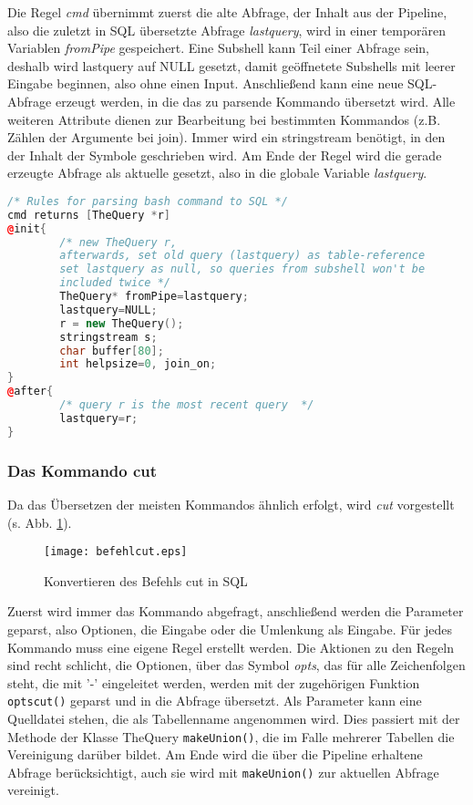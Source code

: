 Die Regel \textit{cmd} übernimmt zuerst die alte Abfrage, der Inhalt aus der Pipeline, also die zuletzt in SQL übersetzte Abfrage \textit{lastquery}, wird in einer temporären Variablen \textit{fromPipe} gespeichert. Eine Subshell kann Teil einer Abfrage sein, deshalb wird lastquery auf NULL gesetzt, damit geöffnetete Subshells mit leerer Eingabe beginnen, also ohne einen Input. Anschließend kann eine neue SQL-Abfrage erzeugt werden, in die das zu parsende Kommando übersetzt wird. Alle weiteren Attribute dienen zur Bearbeitung bei bestimmten Kommandos (z.B. Zählen der Argumente bei join). Immer wird ein stringstream benötigt, in den der Inhalt der Symbole geschrieben wird. Am Ende der Regel wird die gerade erzeugte Abfrage als aktuelle gesetzt, also in die globale Variable \textit{lastquery}.

\begin{lstlisting}[language=C++]
/* Rules for parsing bash command to SQL */
cmd returns [TheQuery *r]
@init{
        /* new TheQuery r,
        afterwards, set old query (lastquery) as table-reference
        set lastquery as null, so queries from subshell won't be
        included twice */
        TheQuery* fromPipe=lastquery;
        lastquery=NULL;
        r = new TheQuery();
        stringstream s;
        char buffer[80];
        int helpsize=0, join_on;
}
@after{
        /* query r is the most recent query  */
        lastquery=r;
}
\end{lstlisting}

\subsubsection{Das Kommando cut}
Da das Übersetzen der meisten Kommandos ähnlich erfolgt, wird \textit{cut} vorgestellt (s. Abb. \ref{fig:cut}).

\begin{figure}[h]
\centering
\texttt{[image: befehlcut.eps]}
\caption{Konvertieren des Befehls cut in SQL}
\label{fig:cut}
\end{figure}

Zuerst wird immer das Kommando abgefragt, anschließend werden die Parameter geparst, also Optionen, die Eingabe oder die Umlenkung als Eingabe. Für jedes Kommando muss eine eigene Regel erstellt werden. Die Aktionen zu den Regeln sind recht schlicht, die Optionen, über das Symbol \textit{opts}, das für alle Zeichenfolgen steht, die mit '-' eingeleitet werden, werden mit der zugehörigen Funktion \lstinline{optscut()} geparst und in die Abfrage übersetzt.
Als Parameter kann eine Quelldatei stehen, die als Tabellenname angenommen wird. Dies passiert mit der Methode der Klasse TheQuery \lstinline{makeUnion()}, die im Falle mehrerer Tabellen die Vereinigung darüber bildet.
Am Ende wird die über die Pipeline erhaltene Abfrage berücksichtigt, auch sie wird mit \lstinline{makeUnion()} zur aktuellen Abfrage vereinigt.


